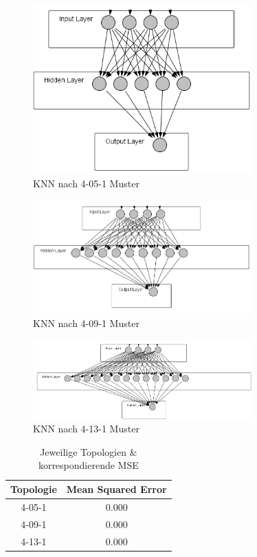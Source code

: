 \documentclass[a4paper,DIV11,bibliography=totoc,headings=normal,ngerman,headsepline,listof=totoc,parskip=half]{scrreprt}
\begin{document}
\begin{figure}[htbp]
\centering
		\includegraphics[width=0.75\textwidth]{4-5-1.PNG}
	\caption{KNN nach 4-05-1 Muster}
	\label{fig:KNN nach 4-05-1 Muster}
\end{figure}


\begin{figure}[H]
\centering
		\includegraphics[width=0.75\textwidth]{4-9-1.PNG}
	\caption{KNN nach 4-09-1 Muster}
	\label{fig:KNN nach 4-09-1 Muster}
\end{figure}



\begin{figure}[htbp]
\centering
		\includegraphics[width=0.75\textwidth]{4-13-1.PNG}
	\caption{KNN nach 4-13-1 Muster}
	\label{fig:KNN nach 4-13-1 Muster}
\end{figure}


\begin{table}
  \centering
  \begin{tabular}{|c|c|}
  \hline 
  \rule[0ex]{0pt}{2.5ex} Topologie & Mean Squared Error \\ 
  \hline 
  \rule[0ex]{0pt}{2.5ex} 4-05-1 & 0.000 \\ 
  \hline 
  \rule[0ex]{0pt}{2.5ex} 4-09-1 & 0.000 \\ 
  \hline 
  \rule[0ex]{0pt}{2.5ex} 4-13-1 & 0.000 \\ 
  \hline 
  \end{tabular} 
  \caption{Jeweilige Topologien \& korrespondierende MSE}
  \label{tab:myfirsttable}
\end{table}
\end{document}
